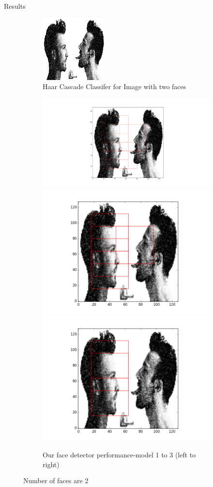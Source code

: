 \documentclass{beamer}
\begin{document}
\begin{frame}{Results}
  \begin{figure}[h]
  \begin{subfigure}{\linewidth}
  \centering
  \includegraphics[width=.3\linewidth]{twohaar.png}\hfill
  \caption{Haar Cascade Classifer for Image with two faces}
  \end{subfigure}\par\medskip
  \begin{subfigure}{\linewidth}
  \includegraphics[width=.3\linewidth]{two83.png}\hfill
  \includegraphics[width=.3\linewidth]{two91.png}\hfill
  \includegraphics[width=.3\linewidth]{two94.png}
  \caption{Our face detector performance-model 1 to 3 (left to right)}
  \end{subfigure}\par\medskip
  \caption{Number of faces are 2}
\end{figure}
\end{frame}
\end{document}
